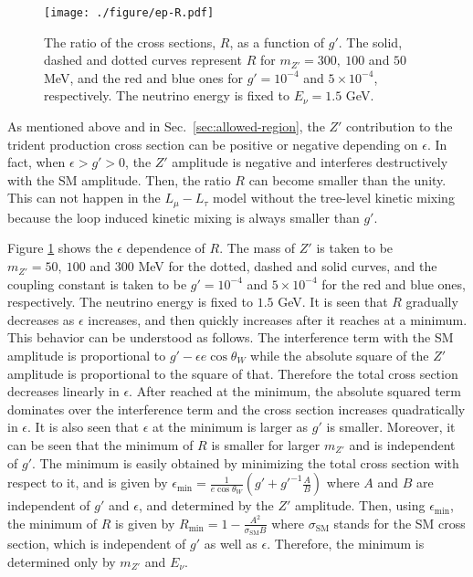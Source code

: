 \documentclass[preprint,amsmath,amssymb,superscriptaddress,nofootinbib]{revtex4}
\begin{document}
\begin{figure}[t]
\begin{center}
\texttt{[image: ./figure/ep-R.pdf]}
\end{center}
\caption{ 
The ratio of the cross sections, $R$, as a function of $g'$. The solid, dashed and dotted curves represent $R$ for 
$m_{Z'} = 300,~100$ and $50$ MeV, and the red and blue ones for $g'=10^{-4}$ and $5 \times 10^{-4}$, 
respectively. The neutrino energy is fixed to $E_\nu = 1.5$ GeV. 
}
\label{fig:trident-3}
\end{figure}

As mentioned above and in Sec.~\ref{sec:allowed-region}, the $Z'$ contribution to the trident production 
cross section can be positive or negative depending on $\epsilon$. In fact, when $\epsilon > g' > 0$, the $Z'$ amplitude is negative and 
interferes destructively with the SM amplitude. 
Then, the ratio $R$ can become smaller than the unity. This can not happen 
in the $L_\mu - L_\tau$ model without the tree-level kinetic mixing because the loop induced kinetic mixing is always 
smaller than $g'$.  


Figure \ref{fig:trident-3} shows the $\epsilon$ dependence of $R$. The mass of $Z'$ is taken to 
be $m_{Z'}=50,~100$ and $300$ MeV for the dotted, dashed and solid curves, and the coupling constant is taken to 
be $g'=10^{-4}$ and $5 \times 10^{-4}$ for the red and blue ones, respectively. 
The neutrino energy is fixed to $1.5$ GeV. 
%
It is seen that $R$ gradually decreases as $\epsilon$ increases, and then quickly increases after it reaches at a minimum. This behavior can be 
understood as follows. The interference term with the SM amplitude is proportional to $g'-\epsilon e \cos\theta_W$ 
while the absolute square of the $Z'$ amplitude is proportional to the square of that.  Therefore the total cross 
section decreases linearly in $\epsilon$. After reached at the minimum, the absolute squared term 
dominates over the interference term and the cross section increases quadratically in $\epsilon$. 
%
It is also seen that $\epsilon$ at the minimum is larger as $g'$ is smaller. Moreover, it can be seen that the 
minimum of $R$ is smaller for larger $m_{Z'}$ and is independent of $g'$. 
The minimum is easily obtained by minimizing the total cross section with respect to it, 
and is given by $ \epsilon_{\mathrm{min}}= \frac{1}{e\cos\theta_W}(g'+ g'^{-1} \frac{A}{B})$ where $A$ and $B$ are independent of $g'$ and $\epsilon$, and 
determined by the $Z'$ amplitude. 
Then, using $\epsilon_{\mathrm{min}}$, the minimum of $R$ is given by $R_{\mathrm{min}} = 1 - \frac{A^2}{\sigma_{\mathrm{SM}} B}$ 
where $\sigma_{\mathrm{SM}}$ stands for the SM cross section, which is independent of $g'$ as well as $\epsilon$. Therefore, the 
minimum is determined only by $m_{Z'}$ and $E_\nu$.
\end{document}

